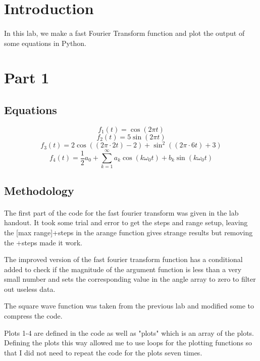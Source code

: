 \tableofcontents

\newpage
\section{Introduction}

\paragraph{}
In this lab, we make a fast Fourier Transform function and plot the output of some equations in Python.

\section{Part 1}


\subsection{Equations}

\[f_1(t)=\cos(2\pi t)\]
\[f_2(t)=5\sin(2\pi t)\]
\[f_3(t)=2\cos((2\pi \cdot 2t)-2)+\sin^2((2\pi \cdot 6t)+3)\]
\[f_4(t)=\frac{1}{2}a_0+\sum_{k=1}^\infty a_k \cos(k\omega _0 t) +b_k \sin(k\omega_0 t) \]

\subsection{Methodology}
\paragraph{}
The first part of the code for the fast fourier transform was given in the lab handout.  It took some trial and error to get the steps and range setup, leaving the [max range]+steps in the arange function gives strange results but removing the +steps made it work.
\par 
The improved version of the fast fourier transform function has a conditional added to check if the magnitude of the argument function is less than a very small number and sets the corresponding value in the angle array to zero to filter out useless data.
\par 
The square wave function was taken from the previous lab and modified some to compress the code.  
\par 
Plots 1-4 are defined in the code as well as "plots" which is an array of the plots.  Defining the plots this way allowed me to use loops for the plotting functions so that I did not need to repeat the code for the plots seven times.  

